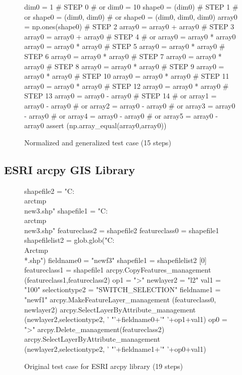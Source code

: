 \begin{figure}
{\scriptsize
\begin{code}
dim0 = 1                            \# STEP 0
\#  or dim0 = 10 
shape0 = (dim0)                     \# STEP 1
\#  or shape0 = (dim0, dim0) 
\#  or shape0 = (dim0, dim0, dim0) 
array0 = np.ones(shape0)            \# STEP 2
array0 = array0 + array0            \# STEP 3
array0 = array0 + array0            \# STEP 4
\#  or array0 = array0 * array0 
array0 = array0 * array0            \# STEP 5
array0 = array0 * array0            \# STEP 6
array0 = array0 * array0            \# STEP 7
array0 = array0 * array0            \# STEP 8
array0 = array0 * array0            \# STEP 9
array0 = array0 * array0            \# STEP 10
array0 = array0 * array0            \# STEP 11
array0 = array0 * array0            \# STEP 12
array0 = array0 * array0            \# STEP 13
array0 = array0 - array0            \# STEP 14
\#  or array1 = array0 - array0 
\#  or array2 = array0 - array0 
\#  or array3 = array0 - array0 
\#  or array4 = array0 - array0 
\#  or array5 = array0 - array0 
assert (np.array\_equal(array0,array0))
\end{code}
}
\caption{Normalized and generalized test case (15 steps)}
\end{figure}

\subsection{ESRI arcpy GIS Library}

\begin{figure}
{\scriptsize 
\begin{code}
shapefile2 = "C:\\arctmp\\new3.shp" 
shapefile1 = "C:\\arctmp\\new3.shp" 
featureclass2 = shapefile2 
featureclass0 = shapefile1 
shapefilelist2 = 
   glob.glob("C:\\Arctmp\\*.shp") 
fieldname0 = "newf3" 
shapefile1 = shapefilelist2 [0] 
featureclass1 = shapefile1 
arcpy.CopyFeatures\_management
   (featureclass1,featureclass2) 
op1 = ">" 
newlayer2 = "l2" 
val1 = "100" 
selectiontype2 = "SWITCH\_SELECTION" 
fieldname1 = "newf1" 
arcpy.MakeFeatureLayer\_management
   (featureclass0, newlayer2) 
arcpy.SelectLayerByAttribute\_management
   (newlayer2,selectiontype2,
   ' "'+fieldname0+'" '+op1+val1) 
op0 = ">" 
arcpy.Delete\_management(featureclass2) 
arcpy.SelectLayerByAttribute\_management
   (newlayer2,selectiontype2,
   ' "'+fieldname1+'" '+op0+val1) 
\end{code}
}
\caption{Original test case for ESRI arcpy library (19 steps)}
\end{figure}

